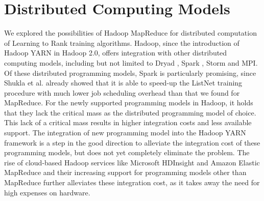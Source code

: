 \section{Distributed Computing Models}
We explored the possibilities of Hadoop MapReduce for distributed computation of Learning to Rank training algorithms. Hadoop, since the introduction of Hadoop YARN in Hadoop 2.0, offers integration with other distributed computing models, including but not limited to Dryad \cite{Isard2007}, Spark \cite{Zaharia2010}, Storm \cite{Aniello2013} and \ac{MPI}. Of these distributed programming models, Spark is particularly promising, since Shukla et al. \cite{Shukla2012} already showed that it is able to speed-up the ListNet training procedure with much lower job scheduling overhead than that we found for MapReduce. For the newly supported programming models in Hadoop, it holds that they lack the critical mass as the distributed programming model of choice. This lack of a critical mass results in higher integration costs and less available support. The integration of new programming model into the Hadoop YARN framework is a step in the good direction to alleviate the integration cost of these programming models, but does not yet completely eliminate the problem. The rise of cloud-based Hadoop services like Microsoft HDInsight and Amazon Elastic MapReduce and their increasing support for programming models other than MapReduce further alleviates these integration cost, as it takes away the need for high expenses on hardware.
